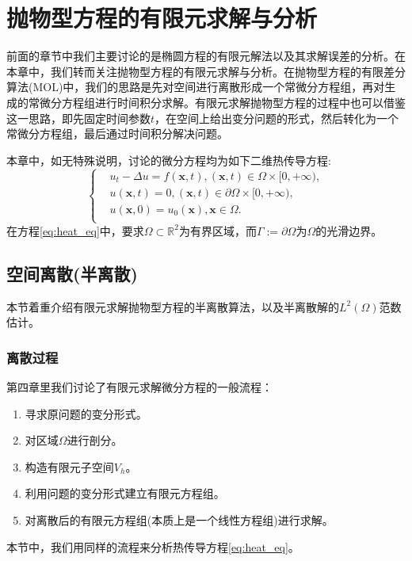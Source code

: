 \chapter{抛物型方程的有限元求解与分析}
前面的章节中我们主要讨论的是椭圆方程的有限元解法以及其求解误差的分析。在本章中，我们转而关注抛物型方程的有限元求解与分析。在抛物型方程的有限差分算法(MOL)中，我们的思路是先对空间进行离散形成一个常微分方程组，再对生成的常微分方程组进行时间积分求解。有限元求解抛物型方程的过程中也可以借鉴这一思路，即先固定时间参数$t$，在空间上给出变分问题的形式，然后转化为一个常微分方程组，最后通过时间积分解决问题。

本章中，如无特殊说明，讨论的微分方程均为如下二维热传导方程:
\begin{equation}
    \label{eq:heat_eq}
    \left\{
        \begin{aligned}
            &u_{t}-\Delta u=f(\mathbf{x},t),(\mathbf{x},t)\in\Omega\times[0,+\infty),\\
            &u(\mathbf{x},t)=0,(\mathbf{x},t)\in\partial\Omega\times[0,+\infty),\\
            &u(\mathbf{x},0)=u_{0}(\mathbf{x}),\mathbf{x}\in\Omega.\\
        \end{aligned}
    \right.
\end{equation}
在方程\eqref{eq:heat_eq}中，要求$\Omega\subset\mathbb{R}^{2}$为有界区域，而$\Gamma:=\partial\Omega$为$\Omega$的光滑边界。

\section{空间离散(半离散)}
本节着重介绍有限元求解抛物型方程的半离散算法，以及半离散解的$L^{2}(\Omega)$范数估计。

\subsection{离散过程}
第四章里我们讨论了有限元求解微分方程的一般流程：
\begin{enumerate}
    \item 寻求原问题的变分形式。
    \item 对区域$\Omega$进行剖分。
    \item 构造有限元子空间$V_{h}$。
    \item 利用问题的变分形式建立有限元方程组。
    \item 对离散后的有限元方程组(本质上是一个线性方程组)进行求解。
\end{enumerate}
本节中，我们用同样的流程来分析热传导方程\eqref{eq:heat_eq}。

